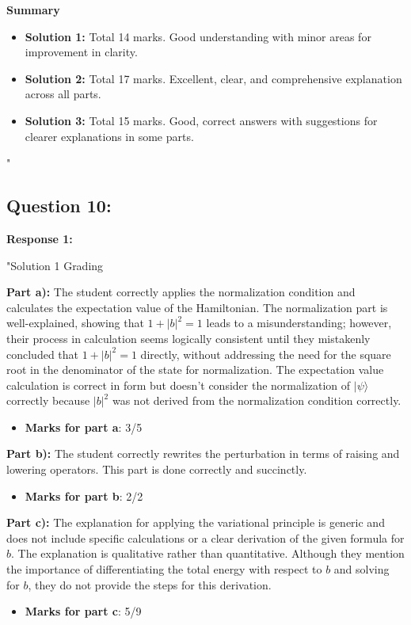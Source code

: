 \documentclass[a4paper,11pt]{article}
\begin{document}
\textbf{Summary}

\begin{itemize}
    \item \textbf{Solution 1:} Total 14 marks. Good understanding with minor areas for improvement in clarity.
    \item \textbf{Solution 2:} Total 17 marks. Excellent, clear, and comprehensive explanation across all parts.
    \item \textbf{Solution 3:} Total 15 marks. Good, correct answers with suggestions for clearer explanations in some parts.
\end{itemize}
"

\subsection*{Question 10:}

\textbf{Response 1:}

"Solution 1 Grading

\textbf{Part a):} The student correctly applies the normalization condition and calculates the expectation value of the Hamiltonian. The normalization part is well-explained, showing that \(1 + |b|^2 = 1\) leads to a misunderstanding; however, their process in calculation seems logically consistent until they mistakenly concluded that \(1 + |b|^2 = 1\) directly, without addressing the need for the square root in the denominator of the state for normalization. The expectation value calculation is correct in form but doesn't consider the normalization of \(|\psi\rangle\) correctly because \(|b|^2\) was not derived from the normalization condition correctly.
\begin{itemize}
    \item \textbf{Marks for part a}: 3/5
\end{itemize}

\textbf{Part b):} The student correctly rewrites the perturbation in terms of raising and lowering operators. This part is done correctly and succinctly.
\begin{itemize}
    \item \textbf{Marks for part b}: 2/2
\end{itemize}

\textbf{Part c):} The explanation for applying the variational principle is generic and does not include specific calculations or a clear derivation of the given formula for \(b\). The explanation is qualitative rather than quantitative. Although they mention the importance of differentiating the total energy with respect to \(b\) and solving for \(b\), they do not provide the steps for this derivation.
\begin{itemize}
    \item \textbf{Marks for part c}: 5/9
\end{itemize}
\end{document}
